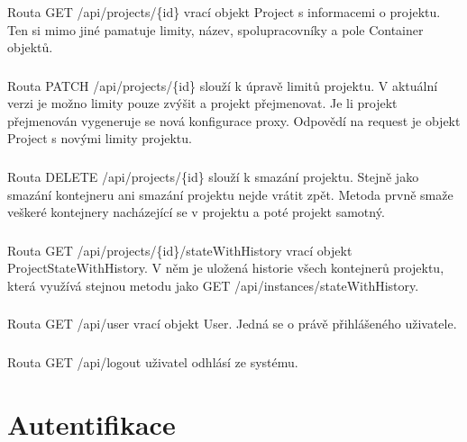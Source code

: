 \documentclass[a4paper,oneside,12pt]{report}
\begin{document}
Routa GET /api/projects/\{id\} vrací objekt Project s informacemi o projektu.
Ten si mimo jiné pamatuje limity, název, spolupracovníky a pole Container objektů.

\subsubsection{}

Routa PATCH /api/projects/\{id\} slouží k úpravě limitů projektu.
V aktuální verzi je možno limity pouze zvýšit a projekt přejmenovat.
Je li projekt přejmenován vygeneruje se nová konfigurace proxy.
Odpovědí na request je objekt Project s novými limity projektu.

\subsubsection{}

Routa DELETE /api/projects/\{id\} slouží k smazání projektu.
Stejně jako  smazání kontejneru ani smazání projektu nejde vrátit zpět.
Metoda prvně smaže veškeré kontejnery nacházející se v projektu a poté projekt samotný.

\subsubsection{}

Routa GET /api/projects/\{id\}/stateWithHistory vrací objekt ProjectStateWithHistory.
V něm je uložená historie všech kontejnerů projektu, která využívá stejnou metodu jako GET /api/instances/stateWithHistory.

\subsubsection{\color{apiblue}{GET -- /api/user}}

Routa GET /api/user vrací objekt User.
Jedná se o právě přihlášeného uživatele.

\subsubsection{\color{apiblue}{GET -- /api/logout}}

Routa GET /api/logout uživatel odhlásí ze systému.


\section{Autentifikace}
\end{document}
